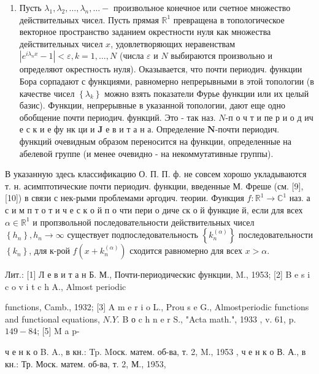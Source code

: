 \documentclass[10pt]{article}
\begin{document}
\begin{enumerate}
  \item Пусть $\lambda_{1}, \lambda_{2}, \ldots, \lambda_{n}, \ldots-$ произвольное конечное или счетное множество действительных чисел. Пусть прямая $\mathbb{R}^{1}$ превращена в топологическое векторное пространство заданием окрестности нуля как множества действительных чисел $x$, удовлетворяющих неравенствам $\left|e^{i \lambda_{n} x}-1\right|<\varepsilon, k=1, \ldots, N$ (числа $\varepsilon$ и $N$ выбираются произвольно и определяют окрестность нуля). Оказывается, что почти периодич. функции Бора сорпадают с функциями, равномерно непрерывными в этой топологии (в качестве чисел $\left\{\lambda_{k}\right\}$ можно взять показатели Фурье функции или их целый базис). Функции, непрерывные в указанной топологии, дают еще одно обобщение почти периодич. функций. Это - так наз. $N$-п о ч т и пе р и о д ич е с к и е фу нк ци и $\boldsymbol{J}$ е в и т а н а. Определение $\boldsymbol{N}$-почти периодич. функций очевидным образом переносится на функции, определенные на абелевой группе (и менее очевидно - на некоммутативные группы).



\end{enumerate}



В указанную здесь классификацию О. П. П. ф. не совсем хорошо укладываются т. н. асимптотические почти периодич. функции, введенные М. Фреше (см. [9], [10]) в связи с нек-рыми проблемами әргодич. теории. Функция $f: \mathbb{R}^{1} \rightarrow \mathbb{C}^{1}$ наз. а с и м п т о т и ч е с к о й п о чти пери о диче ск о й функцие й, если для всех $\alpha \in \mathbb{R}^{1}$ и пропзвольной последовательности действительных чисел $\left\{h_{n}\right\}, h_{n} \rightarrow \infty$ существует подпоследовательность $\left\{k_{n}^{(\alpha)}\right\}$ последовательности $\left\{k_{n}\right\}$, для к-рой $f\left(x+k_{n}^{(\alpha)}\right)$ сходится равномерно для всех $x>\alpha$.



Лит.: [1] Л е в и т а н Б. М., Почти-периодическис функции, M., 1953; [2] B e s i c o v i t c h A., Almost periodic

functions, Camb., 1932; [3] A m e r i o L., Prou s e G., Almostperiodic functions and functional equations, $N . Y$. B о c h n e r S., "Acta math.", 1933 , v. 61, p. $149-84$; [5] M a p-

ч е н к о B. A., в кн.: Tp. Mоск. матем. об-ва, т. 2, M., 1953 , ч е н к о В. А., в кн.: Тр. Моск. матем. об-ва, т. 2, М., 1953,
\end{document}
